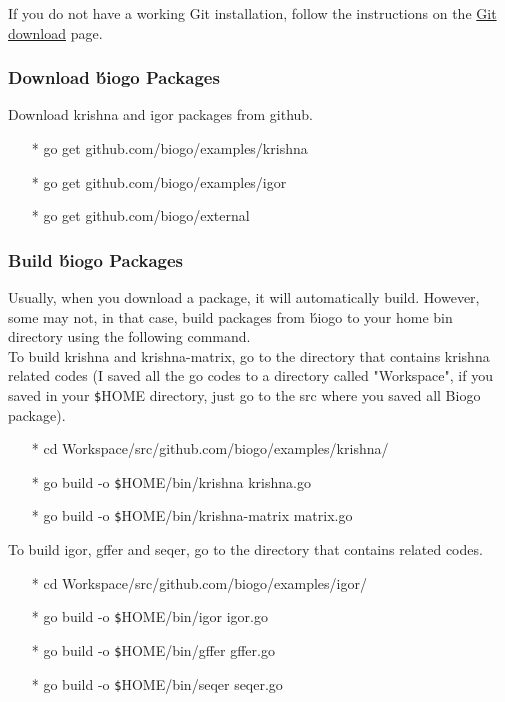\documentclass[12pt]{report}
\begin{document}
\noindent If you do not have a working Git installation, follow the instructions on the \href{https://git-scm.com/downloads}{\color{blue}Git download} page.

\subsubsection*{ Download \'biogo Packages}
Download krishna and igor packages from github.

\begin{enumerate}
	\item[*] go get github.com/biogo/examples/krishna
	\item[*] go get github.com/biogo/examples/igor
	\item[*] go get github.com/biogo/external
\end{enumerate}

\subsubsection*{ Build \'biogo Packages}
Usually, when you download a package, it will automatically build. However, some may not, in that case, build packages from \'biogo to your home bin directory using the following command. \\

To build krishna and krishna-matrix, go to the directory that contains krishna related codes (I saved all the go codes to a directory called "Workspace", if you saved in your \texttt{\$}HOME directory, just go to the src where you saved all Biogo package).
\begin{enumerate}
	\item[*] cd Workspace/src/github.com/biogo/examples/krishna/
	\item[*] go build -o \texttt{\$}HOME/bin/krishna krishna.go
	\item[*] go build -o \texttt{\$}HOME/bin/krishna-matrix matrix.go
\end{enumerate}

To build igor, gffer and seqer, go to the directory that contains related codes.
\begin{enumerate}
	\item[*] cd Workspace/src/github.com/biogo/examples/igor/
	\item[*] go build -o \texttt{\$}HOME/bin/igor igor.go
	\item[*] go build -o \texttt{\$}HOME/bin/gffer gffer.go
	\item[*] go build -o \texttt{\$}HOME/bin/seqer seqer.go
\end{enumerate}
\end{document}
